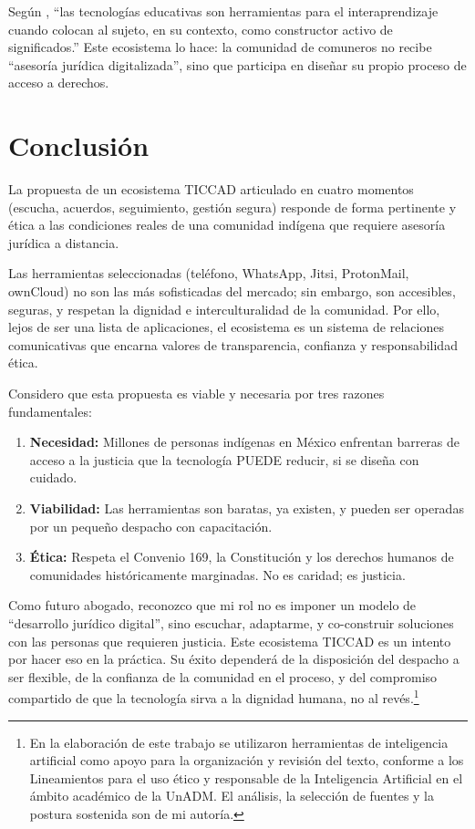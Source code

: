 ﻿\documentclass[
  spanish,
  letterpaper, oneside
]{article}
\begin{document}
Según \citet{zambranoPilay2020tecnologias}, ``las tecnologías educativas son herramientas 
para el interaprendizaje cuando colocan al sujeto, en su contexto, como constructor 
activo de significados.'' Este ecosistema lo hace: la comunidad de comuneros no recibe 
``asesoría jurídica digitalizada'', sino que participa en diseñar su propio proceso 
de acceso a derechos.

\section{Conclusión}

La propuesta de un ecosistema TICCAD articulado en cuatro momentos (escucha, acuerdos, 
seguimiento, gestión segura) responde de forma pertinente y ética a las condiciones 
reales de una comunidad indígena que requiere asesoría jurídica a distancia. 

Las herramientas seleccionadas (teléfono, WhatsApp, Jitsi, ProtonMail, ownCloud) no son 
las más sofisticadas del mercado; sin embargo, son accesibles, seguras, y respetan la dignidad 
e interculturalidad de la comunidad. Por ello, lejos de ser una lista de aplicaciones, el ecosistema 
es un sistema de relaciones comunicativas que encarna valores de transparencia, confianza 
y responsabilidad ética.

Considero que esta propuesta es viable y necesaria por tres razones fundamentales:

\begin{enumerate}
  \item \textbf{Necesidad:} Millones de personas indígenas en México enfrentan barreras 
  de acceso a la justicia que la tecnología PUEDE reducir, si se diseña con cuidado.
  
  \item \textbf{Viabilidad:} Las herramientas son baratas, ya existen, y pueden ser 
  operadas por un pequeño despacho con capacitación.
  
  \item \textbf{Ética:} Respeta el Convenio 169, la Constitución y los derechos humanos 
  de comunidades históricamente marginadas. No es caridad; es justicia.
\end{enumerate}

Como futuro abogado, reconozco que mi rol no es imponer un modelo de ``desarrollo jurídico 
digital'', sino escuchar, adaptarme, y co-construir soluciones con las personas que requieren 
justicia. Este ecosistema TICCAD es un intento por hacer eso en la práctica. Su éxito dependerá 
de la disposición del despacho a ser flexible, de la confianza de la comunidad en el proceso, 
y del compromiso compartido de que la tecnología sirva a la dignidad humana, no al revés.\footnote{En la elaboración de este trabajo se utilizaron herramientas de inteligencia artificial como apoyo para la organización y revisión del texto, conforme a los Lineamientos para el uso ético y responsable de la Inteligencia Artificial en el ámbito académico de la UnADM. El análisis, la selección de fuentes y la postura sostenida son de mi autoría.}
\end{document}
